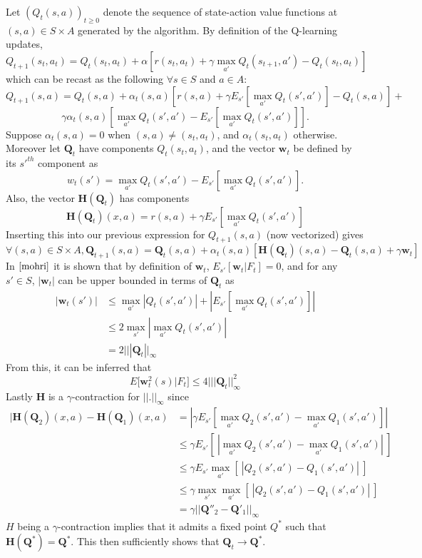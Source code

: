 \documentclass{article} %
\begin{document}
Let $(Q_t(s,a))_{t\geq 0}$ denote the sequence of state-action value functions at $(s,a) \in S \times A$ generated by the algorithm.  By definition of the Q-learning updates,
$$
Q_{t+1}(s_t,a_t) = Q_t(s_t,a_t) + \alpha[r(s_t,a_t) + \gamma \max_{a'}Q_t(s_{t+1},a') - Q_t(s_t,a_t)]
$$
which can be recast as the following $\forall s \in S$ and $a \in A$:
$$
Q_{t+1}(s,a) = Q_t(s,a) + \alpha_t(s,a)[r(s,a) + \gamma E_{s'}[\max_{a'}Q_t(s',a')] - Q_t(s,a)] +
$$
$$
\gamma\alpha_t(s,a)[\max_{a'}Q_t(s',a') - E_{s'}[\max_{a'}Q_t(s',a')] ].
$$
Suppose $\alpha_t(s,a) = 0$ when $(s,a) \neq (s_t,a_t)$, and $\alpha_t(s_t,a_t)$ otherwise. Moreover let $\textbf{Q}_t$ have components $Q_t(s_t,a_t)$, and the vector $\textbf{w}_t$ be defined by its $s'^{th}$ component as
$$
w_t(s') = \max_{a'}Q_t(s',a') - E_{s'} [\max_{a'}Q_t(s',a') ].
$$
Also, the vector $\textbf{H}(\textbf{Q}_t)$ has components
$$
\textbf{H}(\textbf{Q}_t)(x,a) = r(s,a) + \gamma E_{s'}[\max_{a'}Q_t(s',a') ]
$$
Inserting this into our previous expression for $Q_{t+1}(s,a)$ (now vectorized) gives
$$
\forall (s,a) \in S \times A, \textbf{Q}_{t+1}(s,a) = \textbf{Q}_t(s,a) + \alpha_t(s,a)[\textbf{H}(\textbf{Q}_t)(s,a) - \textbf{Q}_t(s,a) + \gamma\textbf{w}_t]
$$
In $\cite{mohri}$ it is shown that by definition of $\textbf{w}_t$, $E_{s'}[\textbf{w}_t | F_t] = 0$, and for any $s' \in S$, $|\textbf{w}_t|$ can be upper bounded in terms of $\textbf{Q}_t$ as
\begin{align*}
|\textbf{w}_t(s')| &\leq \max_{a'}|Q_t(s',a')| + |E_{s'}[\max_{a'}Q_t(s',a')] | \\
& \leq 2\max_{s'}|\max_{a'}Q_t(s',a')|\\
&= 2|||\textbf{Q}_t||_{\infty}
\end{align*}
From this, it can be inferred that
$$
E[\textbf{w}^2_t(s) | F_t] \leq 4|||\textbf{Q}_t||^2_{\infty}
$$
Lastly $\textbf{H}$ is a $\gamma$-contraction for $||.||_{\infty}$ since
\begin{align*}
|\textbf{H}(\textbf{Q}_2)(x,a) - \textbf{H}(\textbf{Q}_1)(x,a) & = |\gamma E_{s'} [\max_{a'}Q_2(s',a') - \max_{a'}Q_1(s',a')] |\\
&\leq \gamma E_{s'}[ ~|\max_{a'}Q_2(s',a') - \max_{a'}Q_1(s',a')|~]\\
&\leq \gamma E_{s'}\max_{a'}[~|Q_2(s',a') - Q_1(s',a')|~]\\
&\leq \gamma \max_{s'}\max_{a'}[~|Q_2(s',a') - Q_1(s',a')|~]\\
&= \gamma||\textbf{Q}''_2 - \textbf{Q}'_1||_{\infty}
\end{align*}
$H$ being a $\gamma$-contraction implies that it admits a fixed point $Q^*$ such that $\textbf{H}(\textbf{Q}^*) = \textbf{Q}^*$. This then sufficiently shows that $\textbf{Q}_t \rightarrow \textbf{Q}^*$.
\end{document}

